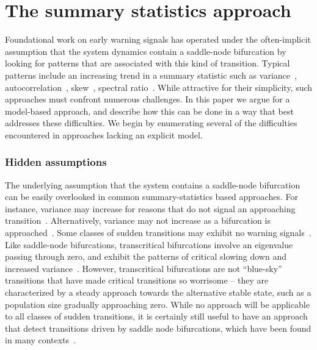 \documentclass[authoryear,review,11pt]{elsarticle}
\begin{document}
\section{The summary statistics approach}
Foundational work on early warning signals has operated under the often-implicit assumption
that the system dynamics contain a saddle-node bifurcation by
looking for patterns that are associated with this kind of transition.
Typical patterns include an increasing trend in a summary statistic such as
variance~\citep{Carpenter2006}, autocorrelation~\citep{Held2004, Dakos2008},
skew~\citep{Guttal2008}, spectral ratio~\citep{Biggs2009}.
While attractive for their simplicity, such approaches must confront numerous challenges.
In this paper we argue for a model-based approach,
and describe how this can be done in a way that best addresses these difficulties.
We begin by enumerating several of the difficulties encountered in approaches lacking an explicit model.



\subsubsection*{Hidden assumptions}
The underlying assumption that the system contains a saddle-node bifurcation
can be easily overlooked in common summary-statistics based approaches.
For instance, variance may increase for reasons that
do not signal an approaching transition~\citep{Schreiber2003, Schreiber2008}.
Alternatively, variance may not increase as a bifurcation is approached~\citep{Livina2012, Dakos2011a}.
Some classes of sudden transitions may exhibit no warning signals~\cite{Hastings2010}.
Like saddle-node bifurcations, transcritical bifurcations involve an eigenvalue passing through zero,
and exhibit the patterns of critical slowing down and increased variance~\citep{Drake2010}.  
However, transcritical bifurcations are not ``blue-sky'' transitions that have made critical transitions so worrisome --
they are characterized by a steady approach towards the alternative stable state, 
such as a population size gradually approaching zero.  
While no approach will be applicable to all classes of sudden transitions,
it is certainly still useful to have an approach that detect transitions driven by
saddle node bifurcations, which have been found in many contexts~\citep[\emph{e.g.}, see][]{Scheffer2001}.
\end{document}
